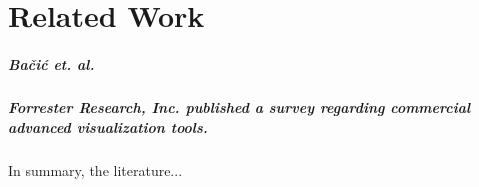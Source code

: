 \chapter{Related Work}
\label{chap:related Work}





\paragraph{Bačić et. al. }

\paragraph{Forrester Research, Inc. published a survey\cite{Evelson2012} regarding commercial advanced visualization tools.}

In summary, the literature...